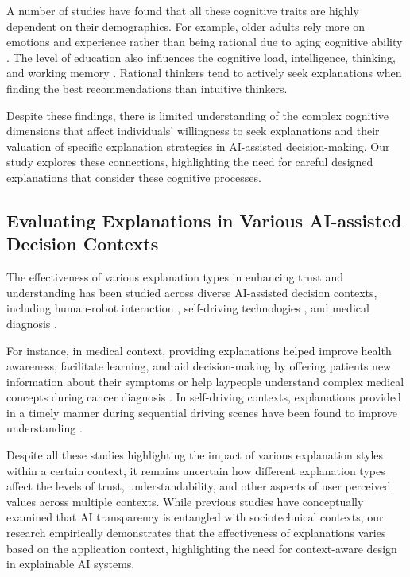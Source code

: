 A number of studies \cite{PartneringPeopleDeepLearning, Doeshighereducationhonecognitive, Domainspecificpreferencesintuitiondeliberationdecision} have found that all these cognitive traits are highly dependent on their demographics. For example, older adults rely more on emotions and experience rather than being rational due to aging cognitive ability \cite{lockenhoff2018aging}. The level of education also influences the cognitive load, intelligence, thinking, and working memory \cite{Doeshighereducationhonecognitive}.  Rational thinkers tend to actively seek explanations when finding the best recommendations than intuitive thinkers. 

Despite these findings, there is limited understanding of the complex cognitive dimensions that affect individuals' willingness to seek explanations and their valuation of specific explanation strategies in AI-assisted decision-making. Our study explores these connections, highlighting the need for careful designed explanations that consider these cognitive processes. 


\subsection{Evaluating Explanations in Various AI-assisted Decision Contexts}
\label{sec:related-work-context}

The effectiveness of various explanation types in enhancing trust and understanding has been studied across diverse AI-assisted decision contexts, including human-robot interaction \cite{ExplainableAgentsRobotsResults, GuidelinesDevelopingExplainableCognitive, SelfExplainingSocialRobotsVerbal, TheoryExplanationsHumanRobotCollaboration, DifferentXAIDifferentHRI}, self-driving technologies \cite{ExplainableAutonomyStudyExplanation, TextualExplanationsSelfDrivingVehicles, TrustingXAIEffectsdifferenttypes}, and medical diagnosis \cite{humanbodyblackboxsupporting, EffectExplanationStylesUser, jimenez2020drug}.

For instance, in medical context, providing explanations helped improve health awareness, facilitate learning, and aid decision-making by offering patients new information about their symptoms \cite{ExploringPromotingDiagnosticTransparency} or help laypeople understand complex medical concepts during cancer diagnosis \cite{EffectExplanationStylesUser}. In self-driving contexts, explanations provided in a timely manner during sequential driving scenes have been found to improve understanding \cite{TrustingXAIEffectsdifferenttypes, ExplainableAutonomyStudyExplanation, TextualExplanationsSelfDrivingVehicles}.

Despite all these studies highlighting the impact of various explanation styles within a certain context, it remains uncertain how different explanation types affect the levels of trust, understandability, and other aspects of user perceived values across multiple contexts. While previous studies \cite{CapturingTrendsApplicationsIssues, ScienceHumanAIDecisionMakingSurvey, ehsan2023charting} have conceptually examined that AI transparency is entangled with sociotechnical contexts, our research empirically demonstrates that the effectiveness of explanations varies based on the application context, highlighting the need for context-aware design in explainable AI systems.
